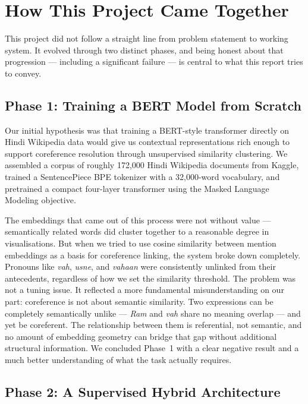 \documentclass[12pt,a4paper]{report}
\begin{document}
\section{How This Project Came Together}

This project did not follow a straight line from problem statement to working system. It evolved through two distinct phases, and being honest about that progression --- including a significant failure --- is central to what this report tries to convey.

\subsection{Phase 1: Training a BERT Model from Scratch}

Our initial hypothesis was that training a BERT-style transformer directly on Hindi Wikipedia data would give us contextual representations rich enough to support coreference resolution through unsupervised similarity clustering. We assembled a corpus of roughly 172,000 Hindi Wikipedia documents from Kaggle, trained a SentencePiece BPE tokenizer with a 32,000-word vocabulary, and pretrained a compact four-layer transformer using the Masked Language Modeling objective.

The embeddings that came out of this process were not without value --- semantically related words did cluster together to a reasonable degree in visualisations. But when we tried to use cosine similarity between mention embeddings as a basis for coreference linking, the system broke down completely. Pronouns like \textit{vah}, \textit{usne}, and \textit{vahaan} were consistently unlinked from their antecedents, regardless of how we set the similarity threshold. The problem was not a tuning issue. It reflected a more fundamental misunderstanding on our part: coreference is not about semantic similarity. Two expressions can be completely semantically unlike --- \textit{Ram} and \textit{vah} share no meaning overlap --- and yet be coreferent. The relationship between them is referential, not semantic, and no amount of embedding geometry can bridge that gap without additional structural information. We concluded Phase~1 with a clear negative result and a much better understanding of what the task actually requires.

\subsection{Phase 2: A Supervised Hybrid Architecture}
\end{document}
